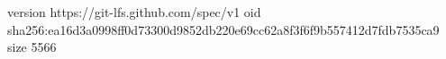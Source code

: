 version https://git-lfs.github.com/spec/v1
oid sha256:ea16d3a0998ff0d73300d9852db220e69cc62a8f3f6f9b557412d7fdb7535ca9
size 5566
